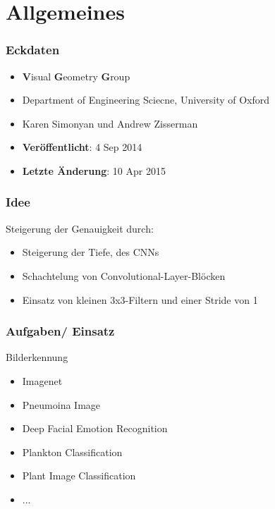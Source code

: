 \documentclass[10pt]{beamer}
\begin{document}
\section{Allgemeines}
\begin{frame}
\frametitle{Eckdaten}
\begin{itemize}
	\setlength\itemsep{1em}
	\item \textbf{V}isual \textbf{G}eometry \textbf{G}roup
	\item Department of Engineering Sciecne, University of Oxford
	\item Karen Simonyan und Andrew Zisserman
	\item \textbf{Ver\"offentlicht}: 4 Sep 2014
	\item \textbf{Letzte \"Anderung}: 10 Apr 2015
\end{itemize}
\end{frame}

\begin{frame}
\frametitle{Idee}
\begin{block}{Steigerung der Genauigkeit durch:}
\begin{itemize}
	\setlength\itemsep{1em}
	\item Steigerung der Tiefe, des CNNs
	\item Schachtelung von Convolutional-Layer-Bl\"ocken
	\item Einsatz von kleinen 3x3-Filtern und einer Stride von 1
\end{itemize}
\end{block}
\end{frame}

\begin{frame}
\frametitle{Aufgaben/ Einsatz}
\begin{block}{Bilderkennung}
\begin{itemize}
	\setlength\itemsep{1em}
	\item Imagenet
	\item Pneumoina Image
	\item Deep Facial Emotion Recognition
	\item Plankton Classification
	\item Plant Image Classification
	\item ...
\end{itemize}
\end{block}
\end{frame}

\end{document}

